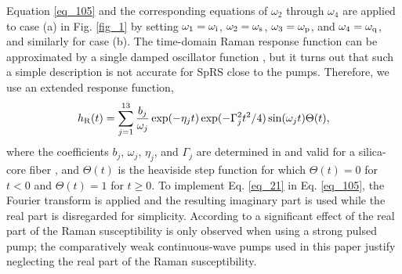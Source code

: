\documentclass[10pt,letterpaper]{article}
\begin{document}
Equation \eqref{eq_105} and the corresponding equations of $\omega_2$ through $\omega_4$ are applied to case (a) in Fig. \ref{fig_1} by setting $\omega_1 = \omega_{\rm i}$, $\omega_2 = \omega_{\rm s}$, $\omega_3 = \omega_{\rm p}$, and $\omega_4 = \omega_{\rm q}$, and similarly for case (b). The time-domain Raman response function can be approximated by a single damped oscillator function \cite{Blow_1989}, but it turns out that such a simple description is not accurate for SpRS close to the pumps. Therefore, we use an extended response function,
\begin{eqnarray} \label{eq_21}
h_{\rm R}(t) = \sum_{j = 1}^{13}\frac{b_j}{\omega_j}\exp(-\eta_j t)\exp(-\Gamma_j^2 t^2/4)\sin(\omega_j t)\Theta(t),
\end{eqnarray}
where the coefficients $b_j$, $\omega_j$, $\eta_j$, and $\Gamma_j$ are determined in \cite{Hollenbeck_2002} and valid for a silica-core fiber \cite{Stolen_1989}, and $\Theta(t)$ is the heaviside step function for which $\Theta(t) = 0$ for $t<0$ and $\Theta(t) = 1$ for $t \geq 0$. To implement Eq. \eqref{eq_21} in Eq. \eqref{eq_105}, the Fourier transform is applied and the resulting imaginary part is used while the real part is disregarded for simplicity. According to \cite{Hsieh_2007} a significant effect of the real part of the Raman susceptibility is only observed when using a strong pulsed pump; the comparatively weak continuous-wave pumps used in this paper justify neglecting the real part of the Raman susceptibility.
\end{document}
